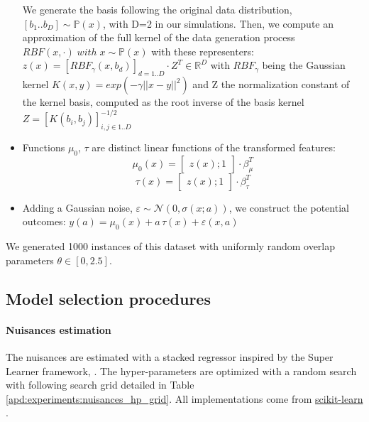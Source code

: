 \documentclass[french,12pt,twoside,a4paper]{book}
\begin{document}
\begin{appendices}
\begin{itemize}
          We generate the basis following the original data distribution, $\left [
              b_1 .. b_D \right ] \sim \mathbb P(x)$, with D=2 in our simulations. Then, we
          compute an approximation of the full kernel of the data generation
          process $RBF(x, \cdot) \;  with \; x \sim \mathbb P(x)$ with these
          representers: $z(x) = [RBF_{\gamma}(x, b_d)]_{d=1..D}
            \cdot Z^T \in \mathbb{R}^D$
          with $RBF_{\gamma}$ being the Gaussian kernel $K(x, y) = exp(-\gamma
            ||x-y||^2)$ and Z the normalization constant of the kernel basis,
          computed as the root inverse of the basis kernel $Z=[K(b_i, b_j)]_{i, j
            \in {1..D}}^{-1/2}$


    \item Functions $\mu_0$, $\tau$ are distinct linear functions of the
          transformed features:
          \begin{equation*}
            \mu_0(x) = \begin{bmatrix} z(x); 1 \end{bmatrix} \cdot \beta_{\mu}^T
          \end{equation*}
          \begin{equation*}
            \tau(x) = \begin{bmatrix} z(x); 1 \end{bmatrix} \cdot \beta_{\tau}^T
          \end{equation*}
    \item Adding a Gaussian noise, $\varepsilon \sim \mathcal N(0, \sigma(x;a))$,
          we construct the potential outcomes:
          $y(a) = \mu_0(x) + a\,\tau(x) + \varepsilon(x, a)$
  \end{itemize}
  We generated 1000 instances of this dataset with uniformly random overlap
  parameters $\theta \in \left[ 0, 2.5 \right]$.

  \subsection{Model selection procedures}

  \paragraph{Nuisances estimation}\label{apd:experiments:nuisances_hp}

  The nuisances are estimated with a stacked regressor inspired by the Super
  Learner framework, \citep{laan_super_2007}. The hyper-parameters are
  optimized with a random search with following search grid detailed in Table
  \ref{apd:experiments:nuisances_hp_grid}. All implementations come from
  \href{https://scikit-learn.org/stable/}{scikit-learn}
  \citep{pedregosa_scikitlearn_2011}.


\end{appendices}
\end{document}

